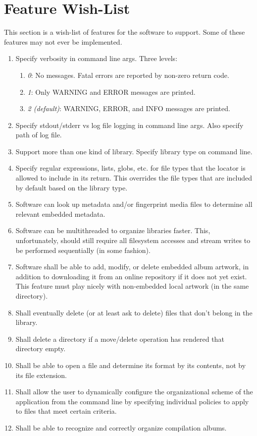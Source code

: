 \documentclass{designdoc}
\begin{document}
\section{Feature Wish-List}
This section is a wish-list of features for the software to support. Some of
these features may not ever be implemented.
\begin{enumerate}
\item Specify verbosity in command line args. Three levels:
  \begin{enumerate}
  \item \textit{0}: No messages. Fatal errors are reported by non-zero return
    code.
  \item \textit{1}: Only WARNING and ERROR messages are printed.
  \item \textit{2 (default)}: WARNING, ERROR, and INFO messages are printed.
  \end{enumerate}
\item Specify stdout/stderr vs log file logging in command line args. Also
  specify path of log file.
\item Support more than one kind of library. Specify library type on command
  line.
\item Specify regular expressions, lists, globs, etc. for file types that
  the locator is allowed to include in its return. This overrides the file
  types that are included by default based on the library type.
\item Software can look up metadata and/or fingerprint media files to determine
  all relevant embedded metadata.
\item Software can be multithreaded to organize libraries faster. This,
  unfortunately, should still require all filesystem accesses and stream writes
  to be performed sequentially (in some fashion).
\item Software shall be able to add, modify, or delete embedded album artwork,
  in addition to downloading it from an online repository if it does not yet
  exist. This feature must play nicely with non-embedded local artwork (in the
  same directory).
\item Shall eventually delete (or at least ask to delete) files that don't
  belong in the library.
\item Shall delete a directory if a move/delete operation has rendered that
  directory empty.
\item Shall be able to open a file and determine its format by its contents,
  not by its file extension.
\item Shall allow the user to dynamically configure the organizational scheme
  of the application from the command line by specifying individual policies to
  apply to files that meet certain criteria.
\item Shall be able to recognize and correctly organize compilation albums.
\end{enumerate}
\end{document}
